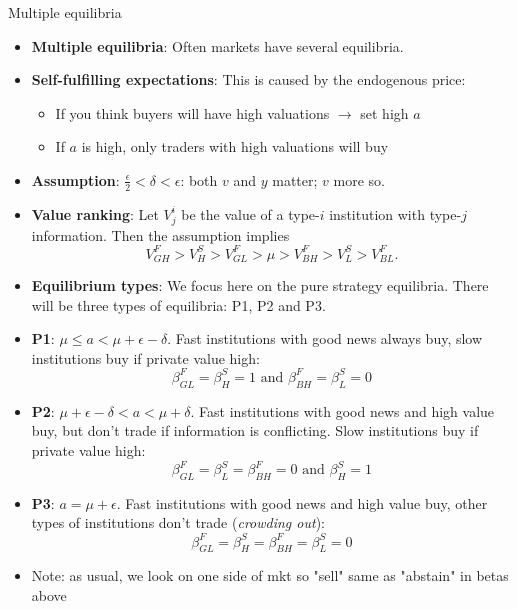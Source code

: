 \documentclass[english,10pt
,aspectratio=169
]{beamer}
\begin{document}
\begin{frame}{Multiple equilibria}
	\begin{itemize}
		\item \textbf{Multiple equilibria}: Often markets have several equilibria.
		\item \textbf{Self-fulfilling expectations}: This is caused by the endogenous price:
		\begin{itemize}
			\item If you think buyers will have high valuations $\rightarrow$ set high $a$
			\item If $a$ is high, only traders with high valuations will buy
		\end{itemize}
		\item \textbf{Assumption}:  $\frac{\epsilon}{2} < \delta < \epsilon$: both $v$ and $y$ matter; $v$ more so.
		\item \textbf{Value ranking}: Let $V^i_j$ be the value of a type-$i$ institution with type-$j$ information. Then the assumption implies
		\[
		V^F_{GH}>V^S_H>V^F_{GL}>\mu>V^F_{BH}>V^S_L>V^F_{BL}.
		\]
		\item \textbf{Equilibrium types}: We focus here on the pure strategy equilibria. There will be three types of equilibria: P1, P2 and P3.
	\end{itemize}
\end{frame}


\begin{frame}{}
	\begin{itemize}
		\item \textbf{P1}: $\mu \leq a < \mu + \epsilon-\delta$. Fast institutions with good news always buy, slow institutions buy if private value high: 
		\[
		\beta^{F}_{GL}=\beta^{S}_{H}=1 \text{ and }\beta^{F}_{BH}=\beta^S_L=0
		\]
		\item \textbf{P2}: $\mu+\epsilon-\delta<a<\mu+\delta$. Fast institutions with good news and high value buy, but don't trade if information is conflicting. Slow institutions buy if private value high: 
		\[
		\beta^{F}_{GL}=\beta^S_L=\beta^{F}_{BH}=0 \text{ and }\beta^{S}_{H}=1
		\]
		\item \textbf{P3}: $a=\mu+\epsilon$. Fast institutions with good news and high value buy, other types of institutions don't trade (\textit{crowding out}):
		\[
		\beta^{F}_{GL}=\beta^{S}_{H}=\beta^{F}_{BH}=\beta^S_L=0
		\]
		\item Note: as usual, we look on one side of mkt so "sell" same as "abstain" in betas above
	\end{itemize}
\end{frame}
\end{document}
